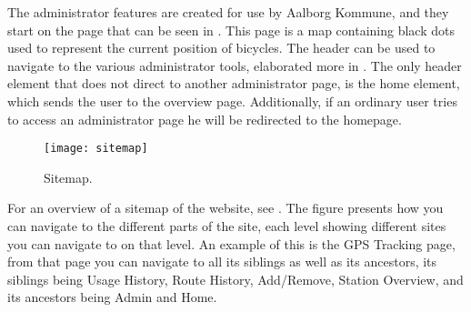 The administrator features are created for use by Aalborg Kommune, and they start on the page that can be seen in .
This page is a map containing black dots used to represent the current position of bicycles.
The header can be used to navigate to the various administrator tools, elaborated more in .
The only header element that does not direct to another administrator page, is the home element, which sends the user to the overview page.
Additionally, if an ordinary user tries to access an administrator page he will be redirected to the homepage.

\begin{figure}[h]
	\centering
	\texttt{[image: sitemap]}
	\caption{Sitemap.}\label{fig:sitemap}
\end{figure}

For an overview of a sitemap of the website, see .
The figure presents how you can navigate to the different parts of the site, each level showing different sites you can navigate to on that level.
An example of this is the GPS Tracking page, from that page you can navigate to all its siblings as well as its ancestors, its siblings being Usage History, Route History, Add/Remove, Station Overview, and its ancestors being Admin and Home.